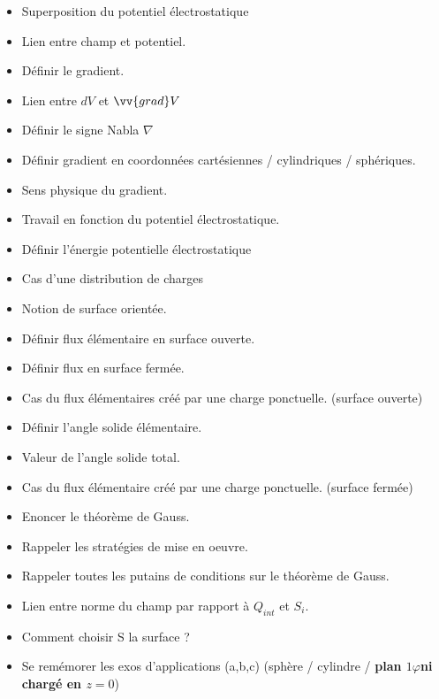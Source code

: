 \documentclass[a4paper, 11pt, hidelinks]{article}
\begin{document}
\begin{itemize}
    \item Superposition du potentiel électrostatique \cite{Chapitre9}
    \item Lien entre champ et potentiel. \cite{Chapitre9}
    \item Définir le gradient. \cite{Chapitre9}
    \item Lien entre $dV$ et $\vv{grad} V$ \cite{Chapitre9}
    \item Définir le signe Nabla $\nabla$ \cite{Chapitre9}
    \item Définir gradient en coordonnées cartésiennes / cylindriques / sphériques. \cite{Chapitre9}
    \item Sens physique du gradient. \cite{Gradient} 
    \item Travail en fonction du potentiel électrostatique. \cite{Chapitre9}
    \item Définir l'énergie potentielle électrostatique \cite{Chapitre9}
    \item Cas d'une distribution de charges \cite{Chapitre9}
    \item Notion de surface orientée. \cite{Chapitre9}
    \item Définir flux élémentaire en surface ouverte. \cite{Chapitre9}
    \item Définir flux en surface fermée. \cite{Chapitre9}
    \item Cas du flux élémentaires créé par une charge ponctuelle. (surface ouverte)\cite{Chapitre9}
    \item Définir l'angle solide élémentaire. \cite{Chapitre9}
    \item Valeur de l'angle solide total. \cite{Chapitre9}
    \item Cas du flux élémentaire créé par une charge ponctuelle. (surface fermée) \cite{Chapitre9}
    \item Enoncer le théorème de Gauss. \cite{Chapitre9}
    \item Rappeler les stratégies de mise en oeuvre. \cite{Chapitre9}
    \item Rappeler toutes les putains de conditions sur le théorème de Gauss. \cite{Chapitre9}
    \item Lien entre norme du champ par rapport à $Q_{int}$ et $S_i$. \cite{Chapitre9}
    \item Comment choisir S la surface ? \cite{Chapitre9}
    \item Se remémorer les exos d'applications (a,b,c) (sphère / cylindre / \textbf{plan $1\varphi$ni chargé en $z=0$}) \cite{Chapitre9}
\end{itemize}
\end{document}
